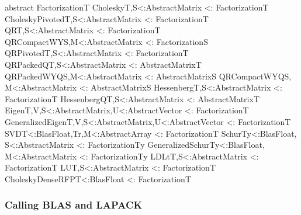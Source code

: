 abstract Factorization{T}
Cholesky{T,S<:AbstractMatrix} <: Factorization{T}
CholeskyPivoted{T,S<:AbstractMatrix} <: Factorization{T}
QR{T,S<:AbstractMatrix} <: Factorization{T}
QRCompactWY{S,M<:AbstractMatrix} <: Factorization{S}
QRPivoted{T,S<:AbstractMatrix} <: Factorization{T}
QRPackedQ{T,S<:AbstractMatrix} <: AbstractMatrix{T}
QRPackedWYQ{S,M<:AbstractMatrix} <: AbstractMatrix{S}
QRCompactWYQ{S, M<:AbstractMatrix} <: AbstractMatrix{S}
Hessenberg{T,S<:AbstractMatrix} <: Factorization{T}
HessenbergQ{T,S<:AbstractMatrix} <: AbstractMatrix{T}
Eigen{T,V,S<:AbstractMatrix,U<:AbstractVector} <: Factorization{T}
GeneralizedEigen{T,V,S<:AbstractMatrix,U<:AbstractVector} <: Factorization{T}
SVD{T<:BlasFloat,Tr,M<:AbstractArray} <: Factorization{T}
Schur{Ty<:BlasFloat, S<:AbstractMatrix} <: Factorization{Ty}
GeneralizedSchur{Ty<:BlasFloat, M<:AbstractMatrix} <: Factorization{Ty}
LDLt{T,S<:AbstractMatrix} <: Factorization{T}
LU{T,S<:AbstractMatrix} <: Factorization{T}
CholeskyDenseRFP{T<:BlasFloat} <: Factorization{T}
\fi

\iffalse
QR factorization: want to support it on all input types, but many
types (integer, rational) are not closed under the needed operations.
compare to eigen~\cite{guennebaud2014eigen}: in C++, if you want a qrfact
of an integer matrix,
you might get a compile time error, or it might work but all the values
will be truncated when stored. this is a big generic programming
challenge. you can't expect types to have a ``type to use for QR fact''
trait.

qrfact computes the type of the result needed:

\begin{singlespace}
\begin{lstlisting}[language=julia]
function qrfact{T}(A::StridedMatrix{T}; pivot=false)
    S = typeof(one(T)/norm(one(T)))
    if S != T
        qrfact!(convert(AbstractMatrix{S},A), pivot=pivot)
    else
        qrfact!(copy(A),pivot=pivot))
    end
end
\end{lstlisting}
\end{singlespace}

This code is not statically typeable, and yet with specialization a
compiler could in fact determine the type of each call site.
It just happens to be convenient to specify this behavior with a
branch.
\fi


\subsubsection{Calling BLAS and LAPACK}
\label{sec:callingblas}

